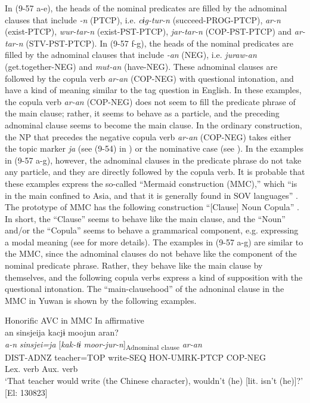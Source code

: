 In (9-57 a-e), the heads of the nominal predicates are filled by the adnominal clauses that include \textit{-n} (PTCP), i.e. \textit{cɨg-tur-n} (succeed-PROG-PTCP), \textit{ar-n} (exist-PTCP), \textit{wur-tar-n} (exist-PST-PTCP), \textit{jar-tar-n} (COP-PST-PTCP) and \textit{ar-tar-n} (STV-PST-PTCP). In (9-57 f-g), the heads of the nominal predicates are filled by the adnominal clauses that include \textit{-an} (NEG), i.e. \textit{juraw-an} (get.together-NEG) and \textit{mut-an} (have-NEG). These adnominal clauses are followed by the copula verb \textit{ar-an} (COP-NEG) with questional intonation, and have a kind of meaning similar to the tag question in English. In these examples, the copula verb \textit{ar-an} (COP-NEG) does not seem to fill the predicate phrase of the main clause; rather, it seems to behave as a particle, and the preceding adnominal clause seems to become the main clause. In the ordinary construction, the NP that precedes the negative copula verb \textit{ar-an} (COP-NEG) takes either the topic marker \textit{ja} (see (9-54) in ) or the nominative case (see ). In the examples in (9-57 a-g), however, the adnominal clauses in the predicate phrase do not take any particle, and they are directly followed by the copula verb. It is probable that these examples express the so-called “Mermaid construction (MMC),” which “is in the main confined to Asia, and that it is generally found in SOV languages” \citep[25]{Tsunoda2013}. The prototype of MMC has the following construction “[Clause] Noun Copula” \citep[16]{Tsunoda2013}. In short, the “Clause” seems to behave like the main clause, and the “Noun” and/or the “Copula” seems to behave a grammarical component, e.g. expressing a modal meaning (see \citealt{Tsunoda2013} for more details). The examples in (9-57 a-g) are similar to the MMC, since the adnominal clauses do not behave like the component of the nominal predicate phrase. Rather, they behave like the main clause by themselves, and the following copula verbs express a kind of supposition with the questional intonation. The “main-clausehood” of the adnoninal clause in the MMC in Yuwan is shown by the following examples.

\ea   Honorific AVC in MMC \label{ex:9.58}
\ea In affirmative\\
 \gllll  an  sinsjeija  kacjɨ  moojun  aran?\\
    \textit{a-n}  \textit{sinsjei=ja}  [\textit{kak-tɨ}  \textit{moor-jur-n}]\textsubscript{Adnominal clause}  \textit{ar-an}\\
    DIST-ADNZ  teacher=TOP  write-SEQ  HON-UMRK-PTCP  COP-NEG\\
        Lex. verb  Aux. verb\\
    \glt     ‘That teacher would write (the Chinese character), wouldn’t (he) [lit. isn’t (he)]?’ [El: 130823]

